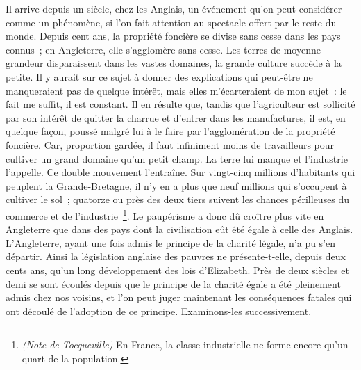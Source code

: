 \documentclass[twoside]{book} %
\begin{document}
Il arrive depuis un siècle, chez les Anglais, un événement qu’on peut considérer comme un phénomène, si l’on fait attention au spectacle offert par le reste du monde. Depuis cent ans, la propriété foncière se divise sans cesse dans les pays connus ; en Angleterre, elle s’agglomère sans cesse. Les terres de moyenne grandeur disparaissent dans les vastes domaines, la grande culture succède à la petite. Il y aurait sur ce sujet à donner des explications qui peut-être ne manqueraient pas de quelque intérêt, mais elles m’écarteraient de mon sujet : le fait me suffit, il est constant. Il en résulte que, tandis que l’agriculteur est sollicité par son intérêt de quitter la charrue et d’entrer dans les manufactures, il est, en quelque façon, poussé malgré lui à le faire par l’agglomération de la propriété foncière. Car, proportion gardée, il faut infiniment moins de travailleurs pour cultiver un grand domaine qu’un petit champ. La terre lui manque et l’industrie l’appelle. Ce double mouvement l’entraîne. Sur vingt-cinq millions d’habitants qui peuplent la Grande-Bretagne, il n’y en a plus que neuf millions qui s’occupent à cultiver le sol ; quatorze ou près des deux tiers suivent les chances périlleuses du commerce et de l’industrie \footnote{\emph{(Note de Tocqueville)} En France, la classe industrielle ne forme encore qu’un quart de la population. }. Le paupérisme a donc dû croître plus vite en Angleterre que dans des pays dont la civilisation eût été égale à celle des Anglais. L'Angleterre, ayant une fois admis le principe de la charité légale, n’a pu s’en départir. Ainsi la législation anglaise des pauvres ne présente-t-elle, depuis deux cents ans, qu’un long développement des lois d’Elizabeth. Près de deux siècles et demi se sont écoulés depuis que le principe de la charité égale a été pleinement admis chez nos voisins, et l’on peut juger maintenant les conséquences fatales qui ont découlé de l’adoption de ce principe. Examinons-les successivement.\par
\end{document}
